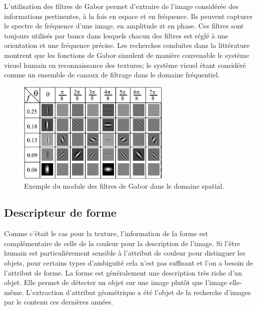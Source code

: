 L'utilisation des filtres de Gabor permet d'extraire de l'image considérée des informations pertinentes, à la fois en espace et en fréquence. Ils peuvent capturer le spectre de fréquence d'une image, en amplitude zt en phase. Ces filtres sont toujours utilisés par bancs dans lesquels chacun des filtres est réglé à une orientation et une fréquence précise. Les recherches conduites dans la littérature montrent que les fonctions de Gabor simulent de manière convenable le système visuel humain en reconnaissance des textures; le système visuel étant considéré comme un ensemble de canaux de filtrage dans le domaine fréquentiel.
 \begin{figure}[H]
 	\label{fig:gabor49}
 	\centering
 	\includegraphics[width=0.65\textwidth]{Figures/gabor49} %
 	
 	\caption{Exemple du module des filtres de Gabor dans le domaine spatial.}
 	
 \end{figure}
 
 
%
%

\subsection{Descripteur de forme}
Comme c'était le cas pour la texture, l'information de la forme est complémentaire de celle de la couleur pour la description de l'image.  Si l'être humain est particulièrement sensible à l'attribut de couleur pour distinguer les objets, pour certains types d'ambiguïté cela n'est pas suffisant et l'on a besoin de l'attribut de forme. La forme est généralement une description très riche d’un objet. Elle permet de détecter un objet sur une image plutôt que l’image elle-même. L’extraction d’attribut géométrique a été l’objet de la recherche d’images par le contenu ces dernières années.\\


